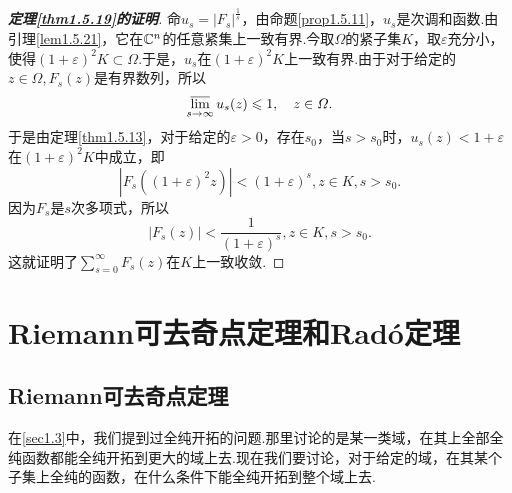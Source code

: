 \begin{proof}[\textbf{定理\ref{thm1.5.19}的证明}]
	命$u_s=|F_s|^{\frac1s}$，由命题\ref{prop1.5.11}，$u_s$是次调和函数.由引理\ref{lem1.5.21}，它在$\MC^n$的任意紧集上一致有界.今取$\Omega$的紧子集$K$，取$\varepsilon$充分小，使得$(1+\varepsilon)^2K\subset\Omega$.于是，$u_s$在$(1+\varepsilon)^2 K$上一致有界.由于对于给定的$z\in\Omega,F_s(z)$是有界数列，所以
	\[\varlimsup_{s\to\infty}u_s(z)\le1,\quad z\in\Omega.\]
	于是由定理\ref{thm1.5.13}，对于给定的$\varepsilon>0$，存在$s_0$，当$s>s_0$时，$u_s(z)<1+\varepsilon$在$(1+\varepsilon)^2 K$中成立，即
	\[|F_s((1+\varepsilon)^2 z)|<(1+\varepsilon)^s,z\in K,s>s_0.\]
	因为$F_s$是$s$次多项式，所以
	\[|F_s(z)|<\frac1{(1+\varepsilon)^s},z\in K,s>s_0.\]
	这就证明了$\sum\limits_{s=0}^\infty F_s(z)$在$K$上一致收敛.
\end{proof}
\section{Riemann可去奇点定理和Rad\'o定理\label{sec1.6}}
\subsection{Riemann可去奇点定理}
在\ref{sec1.3}中，我们提到过全纯开拓的问题.那里讨论的是某一类域，在其上全部全纯函数都能全纯开拓到更大的域上去.现在我们要讨论，对于给定的域，在其某个子集上全纯的函数，在什么条件下能全纯开拓到整个域上去.

